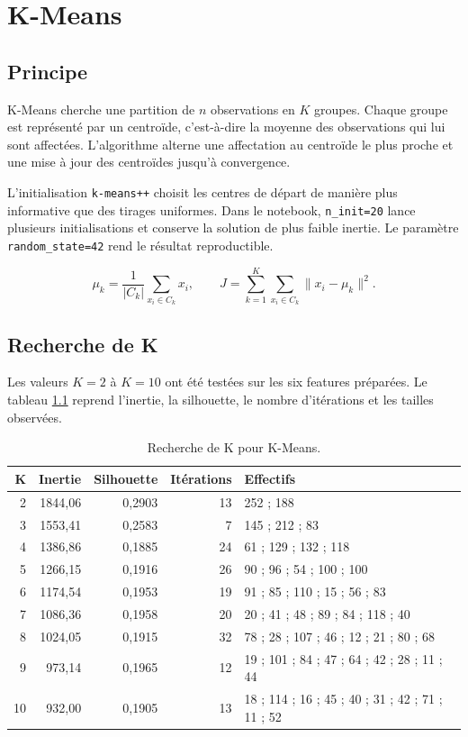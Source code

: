 \chapter{K-Means}

\section{Principe}
K-Means cherche une partition de $n$ observations en $K$ groupes. Chaque groupe est représenté par un centroïde, c'est-à-dire la moyenne des observations qui lui sont affectées. L'algorithme alterne une affectation au centroïde le plus proche et une mise à jour des centroïdes jusqu'à convergence.

L'initialisation \texttt{k-means++} choisit les centres de départ de manière plus informative que des tirages uniformes. Dans le notebook, \texttt{n\_init=20} lance plusieurs initialisations et conserve la solution de plus faible inertie. Le paramètre \texttt{random\_state=42} rend le résultat reproductible.

\begin{equation}
\mu_k=\frac{1}{|C_k|}\sum_{x_i\in C_k}x_i,
\qquad
J=\sum_{k=1}^{K}\sum_{x_i\in C_k}\lVert x_i-\mu_k\rVert^2.
\end{equation}

\section{Recherche de K}
Les valeurs $K=2$ à $K=10$ ont été testées sur les six features préparées. Le tableau \ref{tab:kmeanssearch} reprend l'inertie, la silhouette, le nombre d'itérations et les tailles observées.

\begin{table}[H]
\centering\scriptsize
\caption{Recherche de K pour K-Means.}
\label{tab:kmeanssearch}
\begin{tabular}{rrrrl}
\toprule
K & Inertie & Silhouette & Itérations & Effectifs \\
\midrule
2 & 1844,06 & 0,2903 & 13 & 252 ; 188 \\
3 & 1553,41 & 0,2583 & 7 & 145 ; 212 ; 83 \\
4 & 1386,86 & 0,1885 & 24 & 61 ; 129 ; 132 ; 118 \\
5 & 1266,15 & 0,1916 & 26 & 90 ; 96 ; 54 ; 100 ; 100 \\
6 & 1174,54 & 0,1953 & 19 & 91 ; 85 ; 110 ; 15 ; 56 ; 83 \\
7 & 1086,36 & 0,1958 & 20 & 20 ; 41 ; 48 ; 89 ; 84 ; 118 ; 40 \\
8 & 1024,05 & 0,1915 & 32 & 78 ; 28 ; 107 ; 46 ; 12 ; 21 ; 80 ; 68 \\
9 & 973,14 & 0,1965 & 12 & 19 ; 101 ; 84 ; 47 ; 64 ; 42 ; 28 ; 11 ; 44 \\
10 & 932,00 & 0,1905 & 13 & 18 ; 114 ; 16 ; 45 ; 40 ; 31 ; 42 ; 71 ; 11 ; 52 \\
\bottomrule
\end{tabular}
\end{table}

